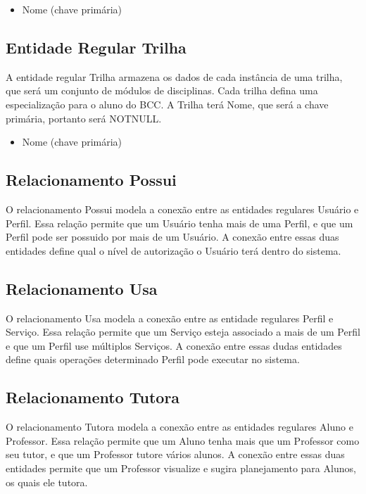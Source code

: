 \documentclass[a4paper]{article}
\begin{document}
\begin{itemize}
    \item Nome (chave primária)
\end{itemize}

\subsection*{Entidade Regular Trilha}
A entidade regular Trilha armazena os dados de cada instância de uma trilha, que
será um conjunto de módulos de disciplinas. Cada trilha defina uma
especialização para o aluno do BCC. A Trilha terá Nome, que será a chave
primária, portanto será NOTNULL.

\begin{itemize}
    \item Nome (chave primária)
\end{itemize}


\subsection*{Relacionamento Possui}
O relacionamento Possui  modela a conexão entre as entidades regulares Usuário e
Perfil. Essa relação permite que um Usuário tenha mais de uma Perfil, e que um
Perfil pode ser possuido por mais de um Usuário.  A conexão entre essas duas
entidades define qual o nível de autorização o Usuário terá dentro do sistema.

\subsection*{Relacionamento Usa}
O relacionamento Usa modela a conexão entre as entidade regulares Perfil e
Serviço. Essa relação permite que um Serviço esteja associado a mais de um
Perfil e que um Perfil use múltiplos Serviços. A conexão entre essas dudas
entidades define quais operações determinado Perfil pode executar no sistema.

\subsection*{Relacionamento Tutora}
O relacionamento Tutora modela a conexão entre as entidades regulares Aluno e
Professor. Essa relação permite que um Aluno tenha mais que um Professor como
seu tutor, e que um Professor tutore vários alunos. A conexão entre essas duas
entidades permite que um Professor visualize e sugira planejamento para Alunos,
os quais ele tutora.
\end{document}
